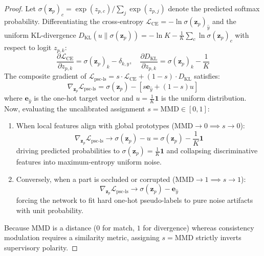 \begin{proof}
Let $\sigma(\mathbf{z}_p)_c = \exp(z_{p,c}) / \sum_j \exp(z_{p,j})$ denote the predicted softmax probability. Differentiating the cross-entropy $\mathcal{L}_{\text{CE}} = -\ln \sigma(\mathbf{z}_p)_{\hat{y}}$ and the uniform KL-divergence $D_{\text{KL}}(u \parallel \sigma(\mathbf{z}_p)) = -\ln K - \frac{1}{K}\sum_c \ln \sigma(\mathbf{z}_p)_c$ with respect to logit $z_{p,k}$:
\begin{equation}
\frac{\partial \mathcal{L}_{\text{CE}}}{\partial z_{p, k}} = \sigma(\mathbf{z}_p)_k - \delta_{k, \hat{y}}, \quad \frac{\partial D_{\text{KL}}}{\partial z_{p, k}} = \sigma(\mathbf{z}_p)_k - \frac{1}{K}
\end{equation}
The composite gradient of $\mathcal{L}_{\text{psc-ls}} = s \cdot \mathcal{L}_{\text{CE}} + (1 - s) \cdot D_{\text{KL}}$ satisfies:
\begin{equation}
\nabla_{\mathbf{z}_p} \mathcal{L}_{\text{psc-ls}} = \sigma(\mathbf{z}_p) - \left[ s \mathbf{e}_{\hat{y}} + (1 - s) u \right]
\end{equation}
where $\mathbf{e}_{\hat{y}}$ is the one-hot target vector and $u = \frac{1}{K}\mathbf{1}$ is the uniform distribution.
Now, evaluating the uncalibrated assignment $s = \mathrm{MMD} \in [0, 1]$:
\begin{enumerate}[leftmargin=*]
    \item When local features align with global prototypes ($\mathrm{MMD} \to 0 \implies s \to 0$):
    \begin{equation}
    \nabla_{\mathbf{z}_p} \mathcal{L}_{\text{psc-ls}} \to \sigma(\mathbf{z}_p) - u = \sigma(\mathbf{z}_p) - \frac{1}{K}\mathbf{1}
    \end{equation}
    driving predicted probabilities to $\sigma(\mathbf{z}_p) = \frac{1}{K}\mathbf{1}$ and collapsing discriminative features into maximum-entropy uniform noise.
    \item Conversely, when a part is occluded or corrupted ($\mathrm{MMD} \to 1 \implies s \to 1$):
    \begin{equation}
    \nabla_{\mathbf{z}_p} \mathcal{L}_{\text{psc-ls}} \to \sigma(\mathbf{z}_p) - \mathbf{e}_{\hat{y}}
    \end{equation}
    forcing the network to fit hard one-hot pseudo-labels to pure noise artifacts with unit probability.
\end{enumerate}
Because MMD is a distance ($0$ for match, $1$ for divergence) whereas consistency modulation requires a similarity metric, assigning $s = \mathrm{MMD}$ strictly inverts supervisory polarity.
\end{proof}

